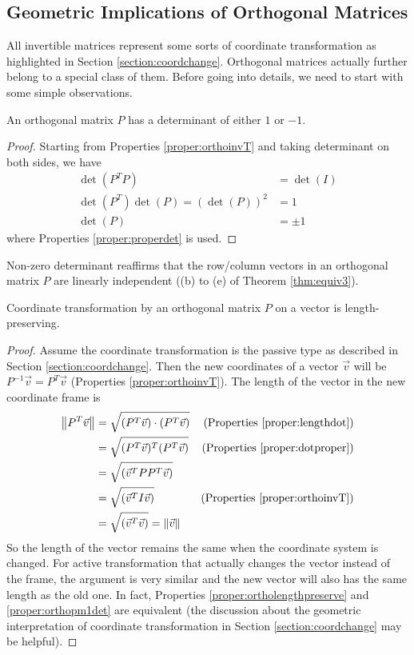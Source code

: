 \subsection{Geometric Implications of Orthogonal Matrices}
\label{section:orthogeometricsub}
All invertible matrices represent some sorts of coordinate transformation as highlighted in Section \ref{section:coordchange}. Orthogonal matrices actually further belong to a special class of them. Before going into details, we need to start with some simple observations.
\begin{proper}
\label{proper:orthopm1det}
An orthogonal matrix $P$ has a determinant of either $1$ or $-1$.
\end{proper}
\begin{proof}
Starting from Properties \ref{proper:orthoinvT} and taking determinant on both sides, we have
\begin{align*}
\det(P^TP) &= \det(I) \\
\det(P^T)\det(P) = (\det(P))^2 &= 1\\
\det(P) &= \pm 1
\end{align*}
where Properties \ref{proper:properdet} is used.    
\end{proof} 
Non-zero determinant reaffirms that the row/column vectors in an orthogonal matrix $P$ are linearly independent ((b) to (e) of Theorem \ref{thm:equiv3}). 
\begin{proper}
\label{proper:ortholengthpreserve}
Coordinate transformation by an orthogonal matrix $P$ on a vector is length-preserving.
\end{proper}
\begin{proof}
Assume the coordinate transformation is the passive type as described in Section \ref{section:coordchange}. Then the new coordinates of a vector $\vec{v}$ will be $P^{-1}\vec{v} = P^T\vec{v}$ (Properties \ref{proper:orthoinvT}). The length of the vector in the new coordinate frame is
\begin{align*}
\norm{P^T\vec{v}} &= \sqrt{(P^T\vec{v})\cdot(P^T\vec{v})} & \text{(Properties \ref{proper:lengthdot})} \\
&= \sqrt{(P^T\vec{v})^T(P^T\vec{v})} & \text{(Properties \ref{proper:dotproper})}\\
&= \sqrt{(\vec{v}^T PP^T \vec{v})} \\
&= \sqrt{(\vec{v}^T I \vec{v})} & \text{(Properties \ref{proper:orthoinvT})} \\
&= \sqrt{(\vec{v}^T\vec{v})} = \norm{\vec{v}}
\end{align*}
So the length of the vector remains the same when the coordinate system is changed. For active transformation that actually changes the vector instead of the frame, the argument is very similar and the new vector will also has the same length as the old one. In fact, Properties \ref{proper:ortholengthpreserve} and \ref{proper:orthopm1det} are equivalent (the discussion about the geometric interpretation of coordinate transformation in Section \ref{section:coordchange} may be helpful).
\end{proof}

